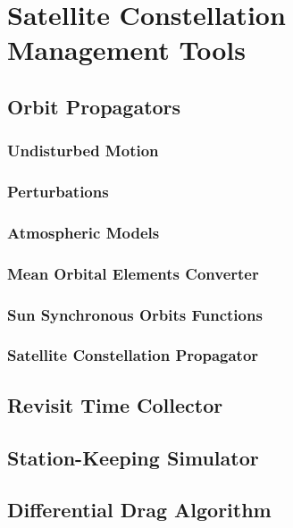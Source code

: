 \chapter{Satellite Constellation Management Tools}


\section{Orbit Propagators}

\subsection{Undisturbed Motion}
\subsection{Perturbations}
\subsection{Atmospheric Models}
\subsection{Mean Orbital Elements Converter}
\subsection{Sun Synchronous Orbits Functions}
\subsection{Satellite Constellation Propagator}

\section{Revisit Time Collector}

\section{Station-Keeping Simulator}

\section{Differential Drag Algorithm}